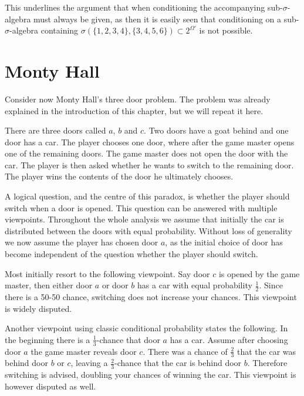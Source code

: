 \documentclass[a4paper]{report}
\theoremstyle{plain}
\theoremstyle{definition}
\theoremstyle{remark}
\numberwithin{equation}{chapter}
\DeclareMathOperator{\1}{\mathbbm{1}}
\begin{document}
This underlines the argument that when conditioning the accompanying sub-$\sigma$-algebra must always be given, as then it is easily seen that conditioning on a sub-$\sigma$-algebra containing $\sigma(\{1,2,3,4\},\{3,4,5,6\})\subset2^{\Omega'}$ is not possible.

\section{Monty Hall}\label{sec:DiscMonty}
Consider now Monty Hall's three door problem. The problem was already explained in the introduction of this chapter, but we will repeat it here.

There are three doors called $a$, $b$ and $c$.  Two doors have a goat behind and one door has a car. The player chooses one door, where after the game master opens one of the remaining doors. The game master does not open the door with the car. The player is then asked whether he wants to switch to the remaining door. The player wins the contents of the door he ultimately chooses.

A logical question, and the centre of this paradox, is whether the player should switch when a door is opened. This question can be answered with multiple viewpoints. Throughout the whole analysis we assume that initially the car is distributed between the doors with equal probability. Without loss of generality we now assume the player has chosen door $a$, as the initial choice of door has become independent of the question whether the player should switch.

Most initially resort to the following viewpoint. Say door $c$ is opened by the game master, then either door $a$ or door $b$ has a car with equal probability $\frac{1}{2}$. Since there is a 50-50 chance, switching does not increase your chances. This viewpoint is widely disputed.

Another viewpoint using classic conditional probability states the following. In the beginning there is a $\frac{1}{3}$-chance that door $a$ has a car. Assume after choosing door $a$ the game master reveals door $c$. There was a chance of $\frac{2}{3}$ that the car was behind door $b$ or $c$, leaving a $\frac{2}{3}$-chance that the car is behind door $b$. Therefore switching is advised, doubling your chances of winning the car. This viewpoint is however disputed as well.
\end{document}
